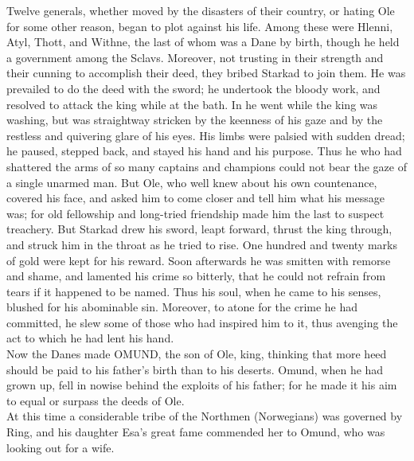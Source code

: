 \documentclass[10pt,a4paper]{report}
\begin{document}
Twelve generals, whether moved by the disasters of their country, or hating Ole for some other reason, began to plot against his life. Among these were Hlenni, Atyl, Thott, and Withne, the last of whom was a Dane by birth, though he held a government among the Sclavs. Moreover, not trusting in their strength and their cunning to accomplish their deed, they bribed Starkad to join them. He was prevailed to do the deed with the sword; he undertook the bloody work, and resolved to attack the king while at the bath. In he went while the king was washing, but was straightway stricken by the keenness of his gaze and by the restless and quivering glare of his eyes. His limbs were palsied with sudden dread; he paused, stepped back, and stayed his hand and his purpose. Thus he who had shattered the arms of so many captains and champions could not bear the gaze of a single unarmed man. But Ole, who well knew about his own countenance, covered his face, and asked him to come closer and tell him what his message was; for old fellowship and long-tried friendship made him the last to suspect treachery. But Starkad drew his sword, leapt forward, thrust the king through, and struck him in the throat as he tried to rise. One hundred and twenty marks of gold were kept for his reward. Soon afterwards he was smitten with remorse and shame, and lamented his crime so bitterly, that he could not refrain from tears if it happened to be named. Thus his soul, when he came to his senses, blushed for his abominable sin. Moreover, to atone for the crime he had committed, he slew some of those who had inspired him to it, thus avenging the act to which he had lent his hand.\\

Now the Danes made OMUND, the son of Ole, king, thinking that more heed should be paid to his father's birth than to his deserts. Omund, when he had grown up, fell in nowise behind the exploits of his father; for he made it his aim to equal or surpass the deeds of Ole.\\

At this time a considerable tribe of the Northmen (Norwegians) was governed by Ring, and his daughter Esa's great fame commended her to Omund, who was looking out for a wife.\\
\end{document}
